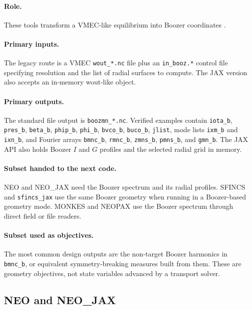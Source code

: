 \documentclass[11pt]{article}
\newcommand{\code}[1]{\texttt{#1}}
\begin{document}
\paragraph{Role.}
These tools transform a VMEC-like equilibrium into Boozer coordinates
\citep{Boozer1983,BoozXformRepo,BoozXformJaxRepo}.

\paragraph{Primary inputs.}
The legacy route is a VMEC \code{wout\_*.nc} file plus an \code{in\_booz.*}
control file specifying resolution and the list of radial surfaces to compute.
The JAX version also accepts an in-memory wout-like object.

\paragraph{Primary outputs.}
The standard file output is \code{boozmn\_*.nc}. Verified examples contain
\code{iota\_b}, \code{pres\_b}, \code{beta\_b}, \code{phip\_b},
\code{phi\_b}, \code{bvco\_b}, \code{buco\_b}, \code{jlist}, mode lists
\code{ixm\_b} and \code{ixn\_b}, and Fourier arrays \code{bmnc\_b},
\code{rmnc\_b}, \code{zmns\_b}, \code{pmns\_b}, and \code{gmn\_b}. The JAX
API also holds Boozer \(I\) and \(G\) profiles and the selected radial grid in
memory.

\paragraph{Subset handed to the next code.}
NEO and NEO\_JAX need the Boozer spectrum and its radial profiles. SFINCS and
\code{sfincs\_jax} use the same Boozer geometry when running in a Boozer-based
geometry mode. MONKES and NEOPAX use the Boozer spectrum through direct field
or file readers.

\paragraph{Subset used as objectives.}
The most common design outputs are the non-target Boozer harmonics in
\code{bmnc\_b}, or equivalent symmetry-breaking measures built from them. These
are geometry objectives, not state variables advanced by a transport solver.

\subsection{NEO and NEO\_JAX}
\end{document}
